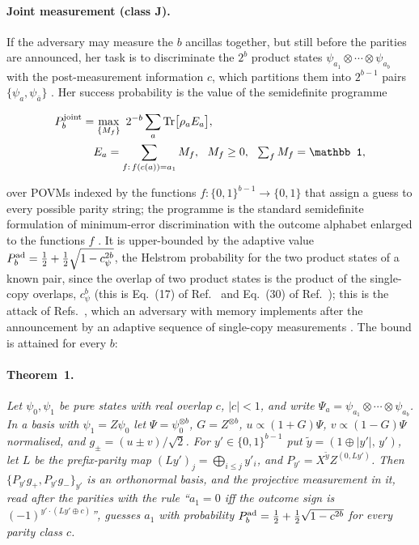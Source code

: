 \documentclass[aps,pra,twocolumn,superscriptaddress,nofootinbib]{revtex4-2}
\begin{document}
\paragraph*{Joint measurement (class J).} If the adversary may measure the $b$ ancillas together, but still before the parities are announced, her task is to discriminate the $2^b$ product states $\psi_{a_1}\otimes\cdots\otimes\psi_{a_b}$ with the post-measurement information $c$, which partitions them into $2^{b-1}$ pairs $\{\psi_a,\psi_{\bar a}\}$ \cite{BWW08,GW10}. Her success probability is the value of the semidefinite programme

\begin{align}
P^{\rm joint}_b&=\max_{\{M_f\}}\ 2^{-b}\sum_{a}\mathrm{Tr}\big[\rho_a E_a\big],\label{eq:sdp}\\
&\quad E_a=\sum_{f:\,f(c(a))=a_1}M_f,\ \ M_f\ge0,\ \ \textstyle\sum_f M_f=\mathbb 1,\nonumber
\end{align}

over POVMs indexed by the functions $f:\{0,1\}^{b-1}\to\{0,1\}$ that assign a guess to every possible parity string; the programme is the standard semidefinite formulation of minimum-error discrimination \cite{EMV03} with the outcome alphabet enlarged to the functions $f$ \cite{BWW08}. It is upper-bounded by the adaptive value $P^{\rm ad}_b=\tfrac12+\tfrac12\sqrt{1-c_\psi^{2b}}$, the Helstrom probability for the two product states of a known pair, since the overlap of two product states is the product of the single-copy overlaps, $c_\psi^{b}$ (this is Eq.~(17) of Ref.~\cite{ABBMM06} and Eq.~(30) of Ref.~\cite{BA07}); this is the attack of Refs.~\cite{ABBMM06,BA07}, which an adversary with memory implements after the announcement by an adaptive sequence of single-copy measurements \cite{ABBMM05}. The bound is attained for every $b$:

\paragraph*{Theorem~1.} \emph{Let $\psi_0,\psi_1$ be pure states with real overlap $c$, $|c|<1$, and write $\Psi_a=\psi_{a_1}\otimes\cdots\otimes\psi_{a_b}$. In a basis with $\psi_1=Z\psi_0$ let $\Psi=\psi_0^{\otimes b}$, $G=Z^{\otimes b}$, $u\propto(1+G)\Psi$, $v\propto(1-G)\Psi$ normalised, and $g_\pm=(u\pm v)/\sqrt2$. For $y'\in\{0,1\}^{b-1}$ put $\tilde y=(1\oplus|y'|,\,y')$, let $L$ be the prefix-parity map $(Ly')_j=\bigoplus_{i\le j}y'_i$, and $P_{y'}=X^{\tilde y}Z^{(0,Ly')}$. Then $\{P_{y'}g_+,P_{y'}g_-\}_{y'}$ is an orthonormal basis, and the projective measurement in it, read after the parities with the rule ``$a_1=0$ iff the outcome sign is $(-1)^{y'\cdot(Ly'\oplus c)}$'', guesses $a_1$ with probability $P^{\rm ad}_b=\tfrac12+\tfrac12\sqrt{1-c^{2b}}$ for every parity class $c$.}
\end{document}
